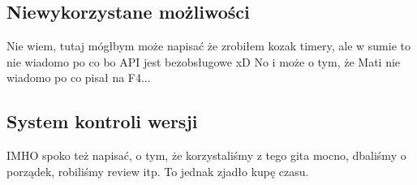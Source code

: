 \subsection{Niewykorzystane możliwości}
Nie wiem, tutaj mógłbym może napisać że zrobiłem kozak timery, ale w sumie to nie wiadomo po co bo API jest bezobsługowe xD No i może o tym, że Mati nie wiadomo po co pisał na F4...

\subsection{System kontroli wersji}
IMHO spoko też napisać, o tym, że korzystaliśmy z tego gita mocno, dbaliśmy o porządek, robiliśmy review itp. To jednak zjadło kupę czasu.
